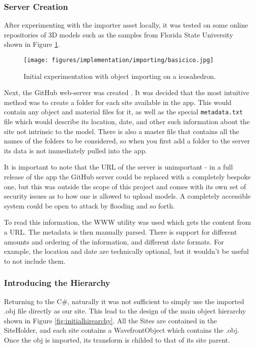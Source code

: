 \documentclass{article}
\begin{document}
\subsubsection{Server Creation}
After experimenting with the importer asset locally, it was tested on some online repositories of 3D models such as the samples from Florida State University \cite{models:samplemodels} shown in Figure \ref{fig:basicico}. 

\begin{figure}[]
    \centering
    \texttt{[image: figures/implementation/importing/basicico.jpg]}
        \caption{Initial experimentation with object importing on a icosahedron.}
        \label{fig:basicico}
\end{figure}

Next, the GitHub web-server was created \cite{tools:repo}. It was decided that the most intuitive method was to create a folder for each site available in the app. This would contain any object and material files for it, as well as the special \verb|metadata.txt| file which would describe its location, date, and other such information about the site not intrinsic to the model. There is also a master file that contains all the names of the folders to be considered, so when you first add a folder to the server its data is not immediately pulled into the app. 

It is important to note that the URL of the server is unimportant - in a full release of the app the GitHub server could be replaced with a completely bespoke one, but this was outside the scope of this project and comes with its own set of security issues as to how one is allowed to upload models. A completely accessible system could be open to attack by flooding and so forth.

To read this information, the WWW utility \cite{models:www} was used which gets the content from a URL. The metadata is then manually parsed. There is support for different amounts and ordering of the information, and different date formats. For example, the location and date are technically optional, but it wouldn't be useful to not include them. 

\subsubsection{Introducing the Hierarchy}
Returning to the C\#, naturally it was not sufficient to simply use the imported .obj file directly as our site. This lead to the design of the main object hierarchy shown in Figure \ref{fig:initialhirearchy}. All the Sites are contained in the SiteHolder, and each \gls{site} contains a WavefrontObject which contains the .obj. Once the obj is imported, its transform is childed to that of its site parent.
\end{document}

